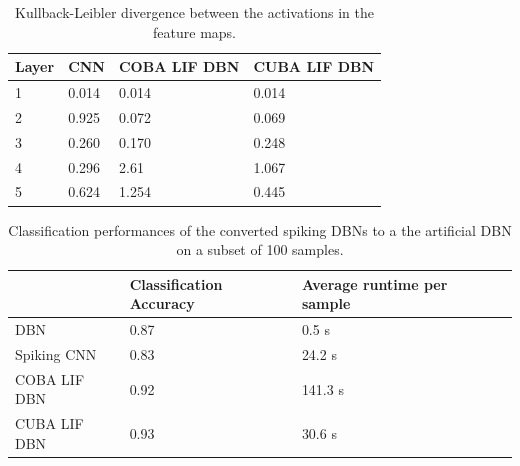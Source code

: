 \begin{table}[]
\centering
\caption{Kullback-Leibler divergence between the activations in the feature maps.}
\label{tab:kldiv}
\begin{tabularx}{\textwidth}{@{}XXXX@{}}
\hline
Layer & CNN   & COBA LIF DBN & CUBA LIF DBN \\ \hline
1     & 0.014 & 0.014        & 0.014        \\
2     & 0.925 & 0.072        & 0.069        \\
3     & 0.260 & 0.170        & 0.248        \\
4     & 0.296 & 2.61         & 1.067        \\
5     & 0.624 & 1.254        & 0.445        \\ \hline
\end{tabularx}
\end{table}


\begin{table}[]
\centering
\caption{Classification performances of the converted spiking DBNs to a the artificial DBN on a subset of 100 samples.}
\label{tab:convperf}
\begin{tabularx}{\textwidth}{@{}XXXX@{}}
\hline
	 				& Classification Accuracy    & Average runtime per sample \\ \hline
DBN     			& 0.87 & 0.5 s               \\
Spiking CNN     	& 0.83 & 24.2 s                \\
COBA LIF DBN     	& 0.92 & 141.3 s                \\
CUBA LIF DBN     	& 0.93 & 30.6 s                 \\\hline
\end{tabularx}
\end{table}


